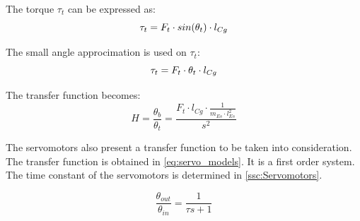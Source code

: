 		The torque $\tau_t$ can be expressed as:
		\begin{equation}
		\tau_t = F_t \cdot sin(\theta_t) \cdot l_{Cg} \addunit{\newton$\cdot$\meter} \label{eq:tau_t}
		\end{equation}
		\startexplain
		\stopexplain
		
		The small angle approcimation is used on $\tau_t$:
		\begin{equation}
		\tau_t = F_t \cdot \theta_t \cdot l_{Cg} \addunit{\newton$\cdot$\meter} \label{eq:tau_t_lin}
		\end{equation}
		
		The transfer function becomes:
		\begin{equation}
		H=\frac{\theta_b}{\theta_t} = \frac{F_t \cdot l_{Cg} \cdot \frac{1}{m_{Es} \cdot l_{Es}^2}}{s^2}
		\label{eq:rocket_angle_model_tf_2}
		\end{equation}
		
		The servomotors also present a transfer function to be taken into consideration. The transfer function is obtained in \autoref{eq:servo_models}. It is a first order system. The time constant of the servomotors is determined in \autoref{ssc:Servomotors}.
		
		\begin{equation}
		\frac{\theta_{out}}{\theta_{in}}=\frac{1}{\tau s + 1}  \label{eq:servo_model}
		\end{equation}
		\startexplain
		\stopexplain
		
